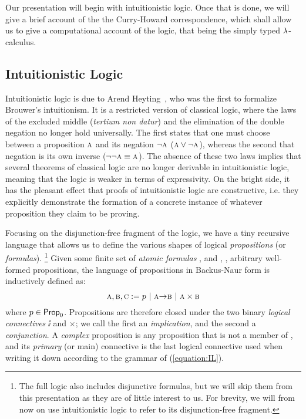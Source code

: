 Our presentation will begin with intuitionistic logic. 
Once that is done, we will give a brief account of the the Curry-Howard correspondence, which shall allow us to give a computational account of the logic, that being the simply typed $\mathnormal{\lambda}$-calculus.

\subsection{Intuitionistic Logic}
\label{subsection:intuitionistic_logic}
Intuitionistic logic is due to Arend Heyting~\cite{heyting1930}, who was the first to formalize Brouwer's intuitionism.
It is a restricted version of classical logic, where the laws of the excluded middle (\textit{tertium non datur}) and the elimination of the double negation no longer hold universally.
The first states that one must choose between a proposition $\prop{a}$ and its negation $\neg \prop{a}$ ($\prop{a} \vee \neg \prop{a}$), whereas the second that negation is its own inverse ($\neg \neg \prop{a} \equiv \prop{a}$).
The absence of these two laws implies that several theorems of classical logic are no longer derivable in intuitionistic logic, meaning that the logic is weaker in terms of expressivity.
On the bright side, it has the pleasant effect that proofs of intuitionistic logic are constructive, i.e. they explicitly demonstrate the formation of a concrete instance of whatever proposition they claim to be proving.

Focusing on the disjunction-free fragment of the logic, we have a tiny recursive language that allows us to define the various shapes of logical \textit{propositions} (or \textit{formulas}).%
\footnote{The full logic also includes disjunctive formulas, but we will skip them from this presentation as they are of little interest to us. For brevity, we will from now on use intuitionistic logic to refer to its disjunction-free fragment.}
Given some finite set of \textit{atomic formulas} \propcon{}, and , ,  arbitrary well-formed propositions, the language of propositions in Backus-Naur form is inductively defined as:
\begin{equation}
\prop{a}, \prop{b}, \prop{c} := p \ | \ \prop{a} \ii \prop{b} \ | \ \prop{a} \times \prop{b} 
\label{equation:IL}
\end{equation}
where $p \in \mathsf{Prop}_0{}$.
Propositions are therefore closed under the two binary \textit{logical connectives} $\ii$ and $\times$; we call the first an \textit{implication}, and the second a \textit{conjunction}. 
A \textit{complex} proposition is any proposition that is not a member of \propcon{}, and its \textit{primary} (or main) connective is the last logical connective used when writing it down according to the grammar of (\ref{equation:IL}).

